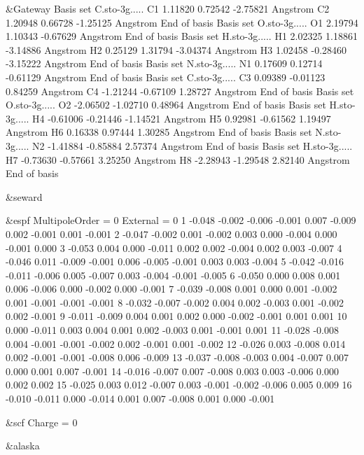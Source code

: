 \begin{inputlisting}
  &Gateway
Basis set
C.sto-3g.....
  C1   1.11820     0.72542    -2.75821 Angstrom
  C2   1.20948     0.66728    -1.25125 Angstrom
End of basis
Basis set
O.sto-3g.....
  O1   2.19794     1.10343    -0.67629 Angstrom
End of basis
Basis set
H.sto-3g.....
  H1   2.02325     1.18861    -3.14886 Angstrom
  H2   0.25129     1.31794    -3.04374 Angstrom
  H3   1.02458    -0.28460    -3.15222 Angstrom
End of basis
Basis set
N.sto-3g.....
  N1   0.17609     0.12714    -0.61129 Angstrom
End of basis
Basis set
C.sto-3g.....
  C3   0.09389    -0.01123     0.84259 Angstrom
  C4  -1.21244    -0.67109     1.28727 Angstrom
End of basis
Basis set
O.sto-3g.....
  O2  -2.06502    -1.02710     0.48964 Angstrom
End of basis
Basis set
H.sto-3g.....
  H4  -0.61006    -0.21446    -1.14521 Angstrom
  H5   0.92981    -0.61562     1.19497 Angstrom
  H6   0.16338     0.97444     1.30285 Angstrom
End of basis
Basis set
N.sto-3g.....
  N2  -1.41884    -0.85884     2.57374 Angstrom
End of basis
Basis set
H.sto-3g.....
  H7  -0.73630    -0.57661     3.25250 Angstrom
  H8  -2.28943    -1.29548     2.82140 Angstrom
End of basis

 &seward

 &espf
MultipoleOrder = 0
External = 0
1  -0.048 -0.002 -0.006 -0.001  0.007 -0.009  0.002 -0.001  0.001 -0.001
2  -0.047 -0.002  0.001 -0.002  0.003  0.000 -0.004  0.000 -0.001  0.000
3  -0.053  0.004  0.000 -0.011  0.002  0.002 -0.004  0.002  0.003 -0.007
4  -0.046  0.011 -0.009 -0.001  0.006 -0.005 -0.001  0.003  0.003 -0.004
5  -0.042 -0.016 -0.011 -0.006  0.005 -0.007  0.003 -0.004 -0.001 -0.005
6  -0.050  0.000  0.008  0.001  0.006 -0.006  0.000 -0.002  0.000 -0.001
7  -0.039 -0.008  0.001  0.000  0.001 -0.002  0.001 -0.001 -0.001 -0.001
8  -0.032 -0.007 -0.002  0.004  0.002 -0.003  0.001 -0.002  0.002 -0.001
9  -0.011 -0.009  0.004  0.001  0.002  0.000 -0.002 -0.001  0.001  0.001
10  0.000 -0.011  0.003  0.004  0.001  0.002 -0.003  0.001 -0.001  0.001
11 -0.028 -0.008  0.004 -0.001 -0.001 -0.002  0.002 -0.001  0.001 -0.002
12 -0.026  0.003 -0.008  0.014  0.002 -0.001 -0.001 -0.008  0.006 -0.009
13 -0.037 -0.008 -0.003  0.004 -0.007  0.007  0.000  0.001  0.007 -0.001
14 -0.016 -0.007  0.007 -0.008  0.003  0.003 -0.006  0.000  0.002  0.002
15 -0.025  0.003  0.012 -0.007  0.003 -0.001 -0.002 -0.006  0.005  0.009
16 -0.010 -0.011  0.000 -0.014  0.001  0.007 -0.008  0.001  0.000 -0.001

 &scf
Charge = 0

 &alaska
\end{inputlisting}

